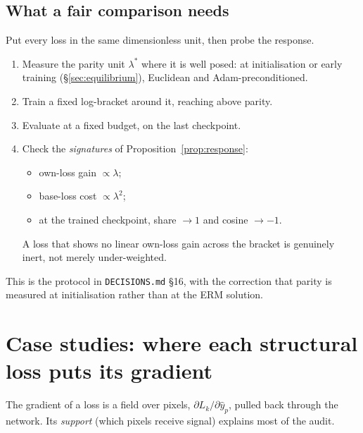 \documentclass[11pt,a4paper]{article}
\theoremstyle{definition}
\theoremstyle{remark}
\begin{document}
\subsection{What a fair comparison needs}
Put every loss in the same dimensionless unit, then probe the response.
\begin{enumerate}[nosep]
\item Measure the parity unit $\lambda^*$ where it is well posed: at initialisation or
  early training (\S\ref{sec:equilibrium}), Euclidean and Adam-preconditioned.
\item Train a fixed log-bracket around it, reaching above parity.
\item Evaluate at a fixed budget, on the last checkpoint.
\item Check the \emph{signatures} of Proposition~\ref{prop:response}:
  \begin{itemize}[nosep]
  \item own-loss gain $\propto\lambda$;
  \item base-loss cost $\propto\lambda^2$;
  \item at the trained checkpoint, share $\to1$ and cosine $\to-1$.
  \end{itemize}
  A loss that shows no linear own-loss gain across the bracket is genuinely inert, not
  merely under-weighted.
\end{enumerate}
This is the protocol in \texttt{DECISIONS.md} \S16, with the correction that parity is
measured at initialisation rather than at the ERM solution.

\section{Case studies: where each structural loss puts its gradient}

The gradient of a loss is a field over pixels, $\partial L_k/\partial\hat y_p$, pulled back
through the network. Its \emph{support} (which pixels receive signal) explains most of the
audit.
\end{document}
